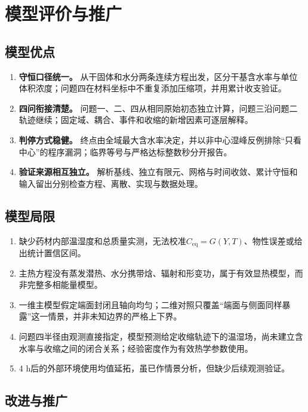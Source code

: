 \section{模型评价与推广}

\subsection{模型优点}

\begin{enumerate}[label=\arabic*)]
  \item \textbf{守恒口径统一。} 从干固体和水分两条连续方程出发，区分干基含水率与单位体积浓度；问题四在材料坐标中不重复添加压缩项，并用累计收支验证。
  \item \textbf{四问衔接清楚。} 问题一、二、四从相同原始初态独立计算，问题三沿问题二轨迹继续；固定域、耦合、事件和收缩的新增因素可逐层解释。
  \item \textbf{判停方式稳健。} 终点由全域最大含水率决定，并以非中心湿峰反例排除“只看中心”的程序漏洞；临界等号与严格达标整数秒分开报告。
  \item \textbf{验证来源相互独立。} 解析基线、独立有限元、网格与时间收敛、累计守恒和输入留出分别检查方程、离散、实现与数据处理。
\end{enumerate}

\subsection{模型局限}

\begin{enumerate}[label=\arabic*)]
  \item 缺少药材内部温湿度和总质量实测，无法校准$C_{\mathrm{eq}}=G(Y,T)$、物性误差或给出统计置信区间。
  \item 主热方程没有蒸发潜热、水分携带焓、辐射和形变功，属于有效显热模型，而非完整多相能量模型。
  \item 一维主模型假定端面封闭且轴向均匀；二维对照只覆盖“端面与侧面同样暴露”这一情景，并非未知边界的严格上下界。
  \item 问题四半径由观测直接指定，模型预测给定收缩轨迹下的温湿场，尚未建立含水率与收缩之间的闭合关系；经验密度作为有效热学参数使用。
  \item 4 h后的外部环境使用均值延拓，虽已作情景分析，但缺少后续观测验证。
\end{enumerate}

\subsection{改进与推广}

